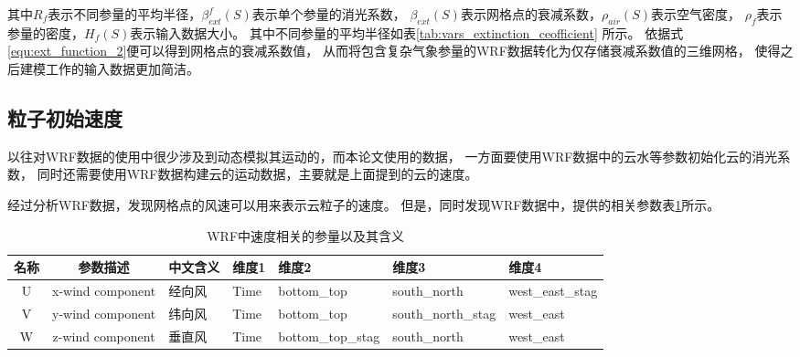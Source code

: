 其中$R_f$表示不同参量的平均半径，$\beta_{ext}^f(S)$表示单个参量的消光系数，
$\beta_{ext}(S)$表示网格点的衰减系数，$\rho_{air}(S)$表示空气密度，
$\rho_f$表示参量的密度，$H_f(S)$表示输入数据大小。
其中不同参量的平均半径如表\ref{tab:vars_extinction_ceofficient} 所示。
依据式\ref{equ:ext_function_2}便可以得到网格点的衰减系数值，
从而将包含复杂气象参量的WRF数据转化为仅存储衰减系数值的三维网格，
使得之后建模工作的输入数据更加简洁。

\subsection{粒子初始速度}
以往对WRF数据的使用中很少涉及到动态模拟其运动的，而本论文使用的数据，
一方面要使用WRF数据中的云水等参数初始化云的消光系数，
同时还需要使用WRF数据构建云的运动数据，主要就是上面提到的云的速度。

经过分析WRF数据，发现网格点的风速可以用来表示云粒子的速度。
但是，同时发现WRF数据中，提供的相关参数表\ref{tab:var-wind}所示。

\begin{table}
	\centering
	\caption{WRF中速度相关的参量以及其含义}
	\label{tab:var-wind}
	\begin{tabular}{c|c|l|l|l|l|l}
		\hline
		\textbf{名称} & \textbf{参数描述} & \textbf{中文含义}
		& \textbf{维度1} &  \textbf{维度2} & \textbf{维度3} & \textbf{维度4}    \\ \hline
		U & x-wind component & 经向风 & Time & bottom\_top & south\_north & west\_east\_stag\\
		V & y-wind component & 纬向风 & Time & bottom\_top & south\_north\_stag & west\_east\\
		W & z-wind component & 垂直风 & Time & bottom\_top\_stag & south\_north & west\_east\\ 
		\hline
	\end{tabular}
\end{table}

